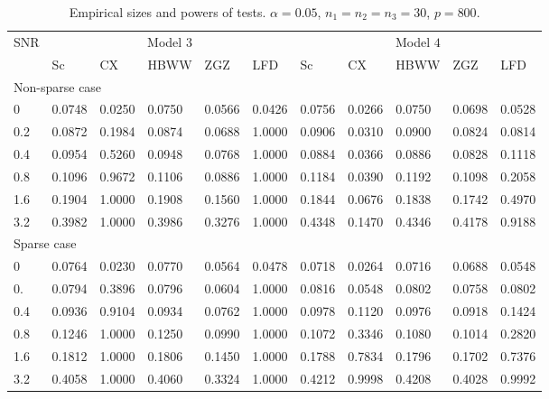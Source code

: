 \documentclass[12pt]{article} %
\theoremstyle{definition}
\begin{document}
\begin{table}[!hbp]
    \caption{Empirical sizes and powers of tests. $\alpha=0.05$, $n_1=n_2=n_3=30$, $p=800$. }
    \label{table4}
    \centering
    \begin{tabular}{*{11}{l}}
    \toprule
    \multirow{2}{*}{SNR} &\multicolumn{5}{c}{Model $3$}&
    \multicolumn{5}{c}{Model $4$} \\
        \cmidrule(r){2-6}\cmidrule(r){7-11}
& Sc & CX & HBWW & ZGZ & LFD & Sc & CX & HBWW & ZGZ & LFD \\ 
    \midrule
    \multicolumn{5}{l}{Non-sparse case}
    \\
    \midrule

0 & 0.0748 & 0.0250 & 0.0750 & 0.0566 & 0.0426 & 0.0756 & 0.0266 & 0.0750 & 0.0698 & 0.0528 \\ 
  0.2 & 0.0872 & 0.1984 & 0.0874 & 0.0688 & 1.0000 & 0.0906 & 0.0310 & 0.0900 & 0.0824 & 0.0814 \\ 
  0.4 & 0.0954 & 0.5260 & 0.0948 & 0.0768 & 1.0000 & 0.0884 & 0.0366 & 0.0886 & 0.0828 & 0.1118 \\ 
  0.8 & 0.1096 & 0.9672 & 0.1106 & 0.0886 & 1.0000 & 0.1184 & 0.0390 & 0.1192 & 0.1098 & 0.2058 \\ 
  1.6 & 0.1904 & 1.0000 & 0.1908 & 0.1560 & 1.0000 & 0.1844 & 0.0676 & 0.1838 & 0.1742 & 0.4970 \\ 
  3.2 & 0.3982 & 1.0000 & 0.3986 & 0.3276 & 1.0000 & 0.4348 & 0.1470 & 0.4346 & 0.4178 & 0.9188 \\ 



    \midrule
    \multicolumn{5}{l}{Sparse case}
    \\
    \midrule

  0 & 0.0764 & 0.0230 & 0.0770 & 0.0564 & 0.0478 & 0.0718 & 0.0264 & 0.0716 & 0.0688 & 0.0548 \\ 
  0. & 0.0794 & 0.3896 & 0.0796 & 0.0604 & 1.0000 & 0.0816 & 0.0548 & 0.0802 & 0.0758 & 0.0802 \\ 
  0.4 & 0.0936 & 0.9104 & 0.0934 & 0.0762 & 1.0000 & 0.0978 & 0.1120 & 0.0976 & 0.0918 & 0.1424 \\ 
  0.8 & 0.1246 & 1.0000 & 0.1250 & 0.0990 & 1.0000 & 0.1072 & 0.3346 & 0.1080 & 0.1014 & 0.2820 \\ 
  1.6 & 0.1812 & 1.0000 & 0.1806 & 0.1450 & 1.0000 & 0.1788 & 0.7834 & 0.1796 & 0.1702 & 0.7376 \\ 
  3.2 & 0.4058 & 1.0000 & 0.4060 & 0.3324 & 1.0000 & 0.4212 & 0.9998 & 0.4208 & 0.4028 & 0.9992 \\ 



\bottomrule
\end{tabular}
\end{table}
\end{document}
